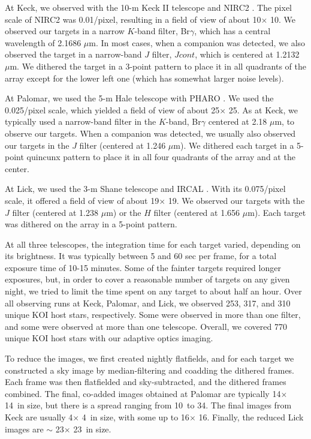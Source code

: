 \documentclass[twocolumn,appendixfloats]{aastex6}
\begin{document}
At Keck, we observed with the 10-m Keck II telescope and NIRC2
\citep{wizinowich04}. The pixel scale of NIRC2 was 0.01\arcsec/pixel, 
resulting in a field of view of about 10\arcsec $\times$ 10\arcsec. 
We observed our targets in a narrow $K$-band filter, Br$\gamma$,
which has a central wavelength of 2.1686 $\mu$m. In most cases, when
a companion was detected, we also observed the target in a narrow-band
$J$ filter, $Jcont$, which is centered at 1.2132 $\mu$m. We dithered the
target in a 3-point pattern to place it in all quadrants of the array except 
for the lower left one (which has somewhat larger noise levels).  

At Palomar, we used the 5-m Hale telescope with PHARO \citep{hayward01}. 
We used the 0.025\arcsec/pixel scale, which yielded a field of view of about 
25\arcsec $\times$ 25\arcsec. As at Keck, we typically used a narrow-band 
filter in the $K$-band, Br$\gamma$ centered at 2.18 $\mu$m, to 
observe our targets. When a companion was detected, we usually also 
observed our targets in the $J$ filter (centered at 1.246 $\mu$m). We dithered
each target in a 5-point quincunx pattern to place it in all four quadrants of
the array and at the center. 

At Lick, we used the 3-m Shane telescope and IRCAL \citep{lloyd00}. 
With its 0.075\arcsec/pixel scale, it offered a field of view of about 19\arcsec $\times$ 
19\arcsec. We observed our targets with the $J$ filter (centered at 1.238 $\mu$m) 
or the $H$ filter (centered at 1.656 $\mu$m). Each target was dithered on the 
array in a 5-point pattern.

At all three telescopes, the integration time for each target varied, depending
on its brightness. It was typically between 5 and 60 sec per frame, for a total
exposure time of 10-15 minutes. Some of the fainter targets required longer
exposures, but, in order to cover a reasonable number of targets on any 
given night, we tried to limit the time spent on any target to about half an hour.
Over all observing runs at Keck, Palomar, and Lick, we observed 253, 317, 
and 310 unique KOI host stars, respectively. Some were observed in more 
than one filter, and some were observed at more than one telescope. Overall, 
we covered 770 unique KOI host stars with our adaptive optics imaging. 

To reduce the images, we first created nightly flatfields, and for each target
we constructed a sky image by median-filtering and coadding the dithered
frames. Each frame was then flatfielded and sky-subtracted, and the dithered 
frames combined.
The final, co-added images obtained at Palomar are typically 14\arcsec $\times$ 
14\arcsec\ in size, but there is a spread ranging from 10\arcsec\ to 34\arcsec.
The final images from Keck are usually 4\arcsec $\times$ 4\arcsec\ in size, with
some up to 16\arcsec $\times$ 16\arcsec. Finally, the reduced Lick images
are $\sim$ 23\arcsec $\times$ 23\arcsec\ in size.
\end{document}
